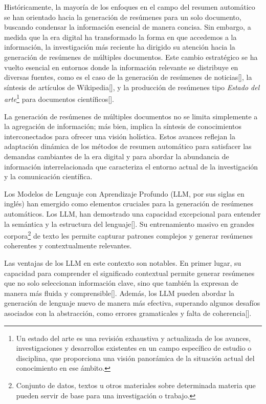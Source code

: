     Históricamente, la mayoría de los enfoques en el campo del resumen automático se han orientado hacia la generación de resúmenes para un solo documento, buscando condensar la información esencial de manera concisa. Sin embargo, a medida que la era digital ha transformado la forma en que accedemos a la información, la investigación más reciente ha dirigido su atención hacia la generación de resúmenes de múltiples documentos. Este cambio estratégico se ha vuelto esencial en entornos donde la información relevante se distribuye en diversas fuentes, como es el caso de la generación de resúmenes de noticias[\cite{fabbri2019multi-news}], la síntesis de artículos de Wikipedia[\cite{liu2018}], y la producción de resúmenes tipo \emph{Estado del arte}\footnote{Un estado del arte es una revisión exhaustiva y actualizada de los avances, investigaciones y desarrollos existentes en un campo específico de estudio o disciplina, que proporciona una visión panorámica de la situación actual del conocimiento en ese ámbito. } para documentos científicos[\cite{lu2020multixscience}].

    La generación de resúmenes de múltiples documentos no se limita simplemente a la agregación de información; más bien, implica la síntesis de conocimientos interconectados para ofrecer una visión holística. 
    Estos avances reflejan la adaptación dinámica de los métodos de resumen automático para satisfacer las demandas cambiantes de la era digital y para abordar la abundancia de información interrelacionada que caracteriza el entorno actual de la investigación y la comunicación científica.

    Los Modelos de Lenguaje con Aprendizaje Profundo (LLM, por sus siglas en inglés) han emergido como elementos cruciales para la generación de resúmenes automáticos. Los LLM, han demostrado una capacidad excepcional para entender la semántica y la estructura del lenguaje[\cite{fewshot}]. Su entrenamiento masivo en grandes corpora\footnote{Conjunto de datos, textos u otros materiales sobre determinada materia que pueden servir de base para una investigación o trabajo.} de texto les permite capturar patrones complejos y generar resúmenes coherentes y contextualmente relevantes.

    Las ventajas de los LLM en este contexto son notables. En primer lugar, su capacidad para comprender el significado contextual permite generar resúmenes que no solo seleccionan información clave, sino que también la expresan de manera más fluida y comprensible[\cite{Radford2018ImprovingLU}]. Además, los LLM pueden abordar la generación de lenguaje nuevo de manera más efectiva, superando algunos desafíos asociados con la abstracción, como errores gramaticales y falta de coherencia[\cite{RoBERTa}].


